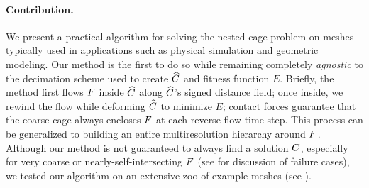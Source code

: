 \paragraph{Contribution.} We present a practical algorithm for solving the
nested cage problem on meshes typically used in applications such as physical
simulation and geometric modeling. Our method is the first to do so while
remaining completely \emph{agnostic} to the decimation scheme used to create
$\widehat{C}$ and fitness function $E$. Briefly, the method first flows $F$ inside $\widehat{C}$
along $\widehat{C}$'s signed distance field; once inside, we rewind the flow while
deforming $\widehat{C}$ to minimize $E$; contact forces guarantee that the coarse cage
always encloses $F$ at each reverse-flow time step. This process can be
generalized to building an entire multiresolution hierarchy around $F$.
Although our method is not guaranteed to always find a solution $C$,
especially for very coarse or nearly-self-intersecting $F$ (see
for discussion of failure cases), we tested our algorithm on an extensive zoo
of example meshes (see ).

